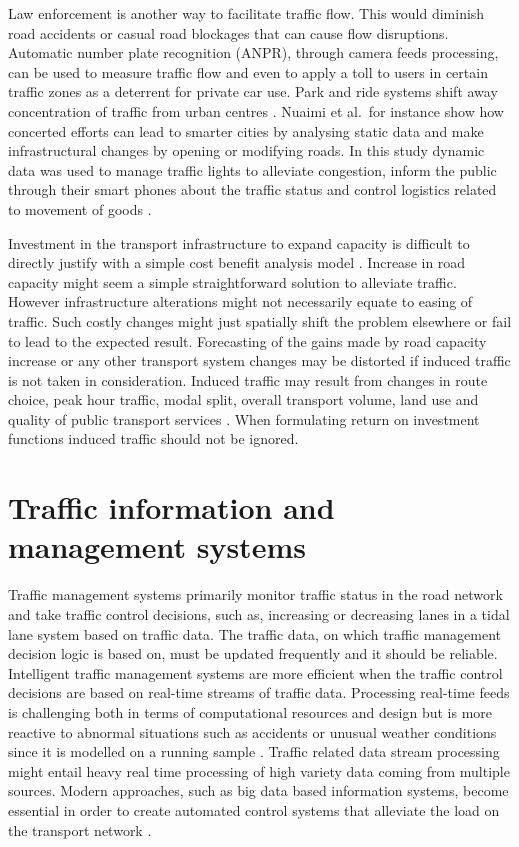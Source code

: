 \documentclass[12pt, a4paper]{report}
\theoremstyle{definition}
\theoremstyle{definition}%
\theoremstyle{definition}%
\theoremstyle{definition}%
\theoremstyle{definition}%
\theoremstyle{definition}%
\begin{document}
Law enforcement is another way to facilitate traffic flow. This would diminish road accidents or casual road blockages that can cause flow disruptions. Automatic number plate recognition (ANPR), through camera feeds processing, can be used to measure traffic flow and even to apply a toll to users in certain traffic zones as a deterrent for private car use.  Park and ride systems shift away concentration of traffic from urban centres \cite{Attard2015}.  Nuaimi et al.\ for instance show how concerted efforts can lead to smarter cities by analysing static data and make infrastructural changes by opening or modifying roads. In this study dynamic data was used to manage traffic lights to alleviate congestion, inform the public through their smart phones about the traffic status and control logistics related to movement of goods \cite{AlNuaimi2015}.

Investment in the transport infrastructure to expand capacity is difficult to directly justify with a simple cost benefit analysis model \cite{atkinson2006cost}. Increase in road capacity might seem a simple straightforward solution to alleviate traffic.  However infrastructure alterations might not necessarily equate to easing of traffic. Such costly changes might just spatially shift the problem elsewhere or fail to lead to the expected result. Forecasting of the gains made by road capacity increase or any other transport system changes may be distorted if induced traffic is not taken in consideration. Induced traffic may result from changes in route choice, peak hour traffic, modal split, overall transport volume, land use and quality of public transport services \cite{Naess2012}. When formulating return on investment functions induced traffic should not be ignored.


\section{Traffic information and management systems}\label{section:introduction:traffic_information_and_management_systems}

Traffic management systems primarily monitor traffic status in the road network and take traffic control decisions, such as, increasing or decreasing lanes in a tidal lane system based on traffic data. The traffic data, on which traffic management decision logic is based on, must be updated frequently and it should be reliable. Intelligent traffic management systems are more efficient when the traffic control decisions are based on real-time streams of traffic data. Processing real-time feeds is challenging both in terms of computational resources and design but is more reactive to abnormal situations such as accidents or unusual weather conditions since it is modelled on a running sample \cite{Toole2015}. Traffic related data stream processing might entail heavy real time processing of high variety data coming from multiple sources. Modern approaches, such as big data based information systems, become essential in order to create automated control systems that alleviate the load on the transport network \cite{Liu2014}.
\end{document}
